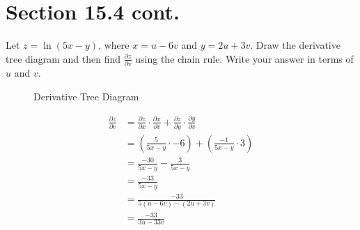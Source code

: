 \documentclass[letter,11pt]{article}
\begin{document}
\section{Section 15.4 cont.}
 Let $z = \ln(5x-y)$, where $x = u-6v$ and $y = 2u + 3v$. Draw the derivative tree diagram and then find $\frac{\partial z}{\partial v}$ using the chain rule. Write your answer in terms of $u$ and $v$.

\begin{figure}[ht]
\centering
{}
\caption{Derivative Tree Diagram}
\end{figure}
\begin{align*}
\frac{\partial z}{\partial v} &= \frac{\partial z}{\partial x} \cdot \frac{\partial x}{\partial v} + \frac{\partial z}{\partial y} \cdot \frac{\partial y}{\partial v}\\
&= \left(\frac{5}{5x-y} \cdot -6\right)+\left(\frac{-1}{5x-y} \cdot 3\right)\\
&= \frac{-30}{5x-y} - \frac{3}{5x-y} \\
&= \frac{-33}{5x-y}\\
&= \frac{-33}{5(u-6v)-(2u + 3v)}\\
&= \frac{-33}{3u-33v}
\end{align*}
\end{document}
